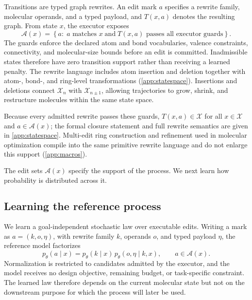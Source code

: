 Transitions are typed graph rewrites. An edit mark $a$ specifies a rewrite
family, molecular operands, and a typed payload, and $T(x,a)$ denotes the
resulting graph. From state $x$, the executor exposes
\begin{equation}
  \mathcal A(x)
  =
  \left\{
    a:\; a\text{ matches } x
    \;\text{and}\;
    T(x,a)\text{ passes all executor guards}
  \right\}.
  \label{eq:gem-editset}
\end{equation}
The guards enforce the declared atom and bond vocabularies, valence
constraints, connectivity, and molecular-size bounds before an edit is
committed. Inadmissible states therefore have zero transition support rather
than receiving a learned penalty. The rewrite language includes atom insertion
and deletion together with atom-, bond-, and ring-level transformations
(\cref{app:statespace}). Insertions and deletions connect $\mathcal X_n$ with
$\mathcal X_{n\pm1}$, allowing trajectories to grow, shrink, and restructure
molecules within the same state space.

Because every admitted rewrite passes these guards, $T(x,a)\in\mathcal X$ for
all $x\in\mathcal X$ and $a\in\mathcal A(x)$; the formal closure statement and
full rewrite semantics are given in \cref{app:statespace}. Multi-edit ring construction and
refinement used in molecular optimization compile into the same primitive
rewrite language and do not enlarge this support (\cref{app:macros}).

The edit sets $\mathcal A(x)$ specify the support of the process. We next learn
how probability is distributed across it.

\subsection{Learning the reference process}
\label{sec:gem-reference}

We learn a goal-independent stochastic law over executable edits. Writing a
mark as $a=(k,o,\eta)$, with rewrite family $k$, operands $o$, and typed payload
$\eta$, the reference model factorizes
\begin{equation}
  p_\theta(a\mid x)
  =
  p_\theta(k\mid x)\,
  p_\theta(o,\eta\mid k,x),
  \qquad a\in\mathcal A(x).
  \label{eq:gem-factorization}
\end{equation}
Normalization is restricted to candidates admitted by the executor, and the
model receives no design objective, remaining budget, or task-specific
constraint. The learned law therefore depends on the current molecular state but
not on the downstream purpose for which the process will later be used.

